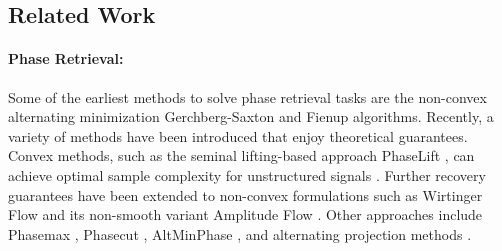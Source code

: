 \documentclass[11pt]{article}
\theoremstyle{remark}
\begin{document}

\subsection{Related Work}


\paragraph{Phase Retrieval:} Some of the earliest methods to solve phase retrieval tasks are the non-convex alternating minimization Gerchberg-Saxton \cite{GerchSaxAlg} and Fienup \cite{FienupAlg} algorithms.  Recently, a variety of methods have been introduced that enjoy theoretical guarantees.  Convex methods, such as the seminal lifting-based approach PhaseLift \cite{CandStrohVoron2013}, can achieve optimal sample complexity for unstructured signals \cite{CandLi2014}.  Further recovery guarantees have been extended to non-convex formulations such as Wirtinger Flow \cite{Candes2015, Wright2016, Mahdi2019} and its non-smooth variant Amplitude Flow \cite{Wang2017,Mahdi2019,AmpFlow}.  Other approaches include Phasemax \cite{Phasemax, BahmaniRomberg_LinProg}, Phasecut \cite{Phasecut}, AltMinPhase \cite{Jain2013}, and alternating projection methods \cite{Waldspurger_Alt_Proj}. %
\end{document}
